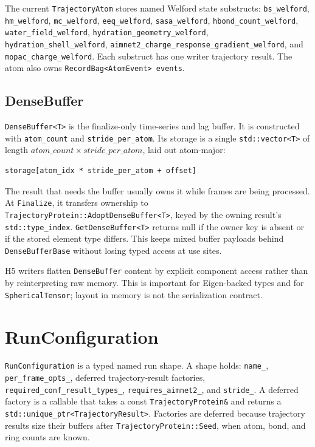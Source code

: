 \documentclass[11pt]{article}
\newcommand{\code}[1]{\texttt{#1}}
\begin{document}
The current \code{TrajectoryAtom} stores named Welford state substructs:
\code{bs\_welford}, \code{hm\_welford}, \code{mc\_welford},
\code{eeq\_welford}, \code{sasa\_welford},
\code{hbond\_count\_welford}, \code{water\_field\_welford},
\code{hydration\_geometry\_welford},
\code{hydration\_shell\_welford},
\code{aimnet2\_charge\_response\_gradient\_welford}, and
\code{mopac\_charge\_welford}. Each substruct has one writer trajectory
result. The atom also owns \code{RecordBag<AtomEvent> events}.

\subsection{DenseBuffer}

\code{DenseBuffer<T>} is the finalize-only time-series and lag buffer. It is
constructed with \code{atom\_count} and \code{stride\_per\_atom}. Its storage is
a single \code{std::vector<T>} of length
\(atom\_count \times stride\_per\_atom\), laid out atom-major:

\begin{lstlisting}
storage[atom_idx * stride_per_atom + offset]
\end{lstlisting}

The result that needs the buffer usually owns it while frames are being
processed. At \code{Finalize}, it transfers ownership to
\code{TrajectoryProtein::AdoptDenseBuffer<T>}, keyed by the owning result's
\code{std::type\_index}. \code{GetDenseBuffer<T>} returns null if the owner key
is absent or if the stored element type differs. This keeps mixed buffer
payloads behind \code{DenseBufferBase} without losing typed access at use
sites.

H5 writers flatten \code{DenseBuffer} content by explicit component access
rather than by reinterpreting raw memory. This is important for Eigen-backed
types and for \code{SphericalTensor}; layout in memory is not the serialization
contract.

\section{RunConfiguration}

\code{RunConfiguration} is a typed named run shape. A shape holds:
\code{name\_}, \code{per\_frame\_opts\_}, deferred trajectory-result factories,
\code{required\_conf\_result\_types\_}, \code{requires\_aimnet2\_}, and
\code{stride\_}. A deferred factory is a callable that takes a const
\code{TrajectoryProtein\&} and returns a
\code{std::unique\_ptr<TrajectoryResult>}.
Factories are deferred because trajectory results size their buffers after
\code{TrajectoryProtein::Seed}, when atom, bond, and ring counts are known.
\end{document}

